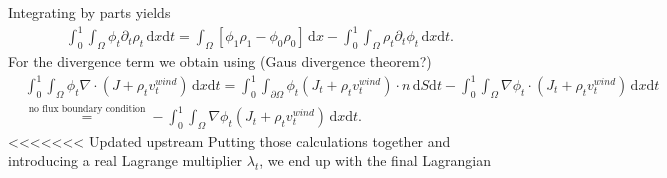 Integrating by parts yields 
\begin{align*}
	\int_0^1\int_\Omega \phi_t\partial_t\rho_t \,\mathrm{d}x\mathrm{d}t = \int_\Omega[\phi_1\rho_1 - \phi_0\rho_0]\,\mathrm{d}x - \int_0^1\int_\Omega \rho_t\partial_t\phi_t \,\mathrm{d}x\mathrm{d}t.
\end{align*}
For the divergence term we obtain using (Gaus divergence theorem?)
\begin{align*}
	&\int_0^1\int_\Omega \phi_t \nabla \cdot (J + \rho_tv_t^{wind}) \,\mathrm{d}x\mathrm{d}t = \int_0^1\int_{\partial\Omega} \phi_t(J_t + \rho_tv_t^{wind}) \cdot n \,\mathrm{d}S\mathrm{d}t - \int_0^1\int_\Omega \nabla\phi_t \cdot (J_t + \rho_tv_t^{wind}) \,\mathrm{d}x\mathrm{d}t \\&\overset{\text{no flux boundary condition}}{=} - \int_0^1\int_\Omega \nabla\phi_t (J_t + \rho_tv_t^{wind}) \,\mathrm{d}x\mathrm{d}t.
\end{align*}
<<<<<<< Updated upstream
Putting those calculations together and introducing a real Lagrange multiplier $\lambda_t$, we end up with the final Lagrangian 
